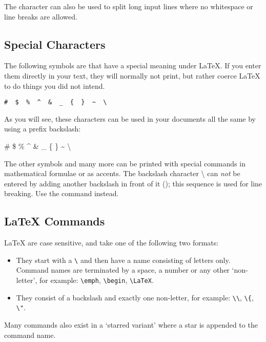 The \ai{\%} character can also be used to split long input lines where no
whitespace or line breaks are allowed.

\subsection{Special Characters}

The following symbols are  that have a special meaning
under \LaTeX{}. If you enter them directly in your text, they will normally not
print, but rather coerce \LaTeX{} to do things you did not intend.
\begin{code}
\verb.#  $  %  ^  &  _  {  }  ~  \ . %
\end{code}

As you will see, these characters can be used in your documents all
the same by using a prefix backslash:

\begin{example}
\# \$ \% \^{} \& \_ \{ \} \~{}
\textbackslash{}
\end{example}

The other symbols and many more can be printed with special commands
in mathematical formulae or as accents. The backslash character
\textbackslash{} can \emph{not} be entered by adding another backslash
in front of it (\ci{\bs}); this sequence is used for
line breaking. Use the  command instead.

\subsection{\LaTeX{} Commands}

\LaTeX{}  are case sensitive, and take one of the following
two formats:

\begin{itemize}
  \item They start with a  \verb|\| and then have a name
        consisting of letters only. Command names are terminated by a
        space, a number or any other \enquote*{non-letter}, for example:
        \verb|\emph|, \verb|\begin|, \verb|\LaTeX|.
  \item They consist of a backslash and exactly one non-letter, for example:
        \verb|\\|, \verb|\{|, \verb|\"|.
\end{itemize}
Many commands also exist in a `starred variant' where a star is appended to the
command name.

